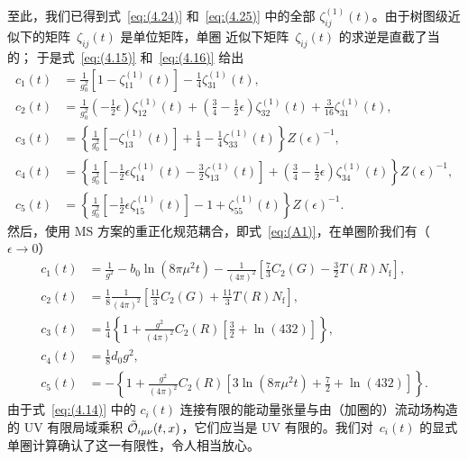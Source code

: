 至此，我们已得到式~\eqref{eq:(4.24)} 和~\eqref{eq:(4.25)}
中的全部 $\zeta_{ij}^{(1)}(t)$。由于树图级近似下的矩阵~$\zeta_{ij}(t)$ 是单位矩阵，单圈
近似下矩阵~$\zeta_{ij}(t)$ 的求逆是直截了当的；
于是式~\eqref{eq:(4.15)} 和~\eqref{eq:(4.16)} 给出
\begin{align}
   c_1(t)&=\frac{1}{g_0^2}
   \left[1-\zeta_{11}^{(1)}(t)\right]
   -\frac{1}{4}\zeta_{31}^{(1)}(t),
\label{eq:(4.55)}\\
   c_2(t)&=\frac{1}{g_0^2}
   \left(-\frac{1}{2}\epsilon\right)\zeta_{12}^{(1)}(t)
   +\left(\frac{3}{4}-\frac{1}{2}\epsilon\right)\zeta_{32}^{(1)}(t)
   +\frac{3}{16}\zeta_{31}^{(1)}(t),
\label{eq:(4.56)}\\
   c_3(t)&=\left\{\frac{1}{g_0^2}
   \left[-\zeta_{13}^{(1)}(t)\right]
   +\frac{1}{4}-\frac{1}{4}\zeta_{33}^{(1)}(t)\right\}Z(\epsilon)^{-1},
\label{eq:(4.57)}\\
   c_4(t)&=\left\{\frac{1}{g_0^2}
   \left[-\frac{1}{2}\epsilon\zeta_{14}^{(1)}(t)
   -\frac{3}{2}\zeta_{13}^{(1)}(t)\right]
   +\left(\frac{3}{4}-\frac{1}{2}\epsilon\right)\zeta_{34}^{(1)}(t)\right\}
   Z(\epsilon)^{-1},
\label{eq:(4.58)}\\
   c_5(t)&=\left\{\frac{1}{g_0^2}
   \left[-\frac{1}{2}\epsilon\zeta_{15}^{(1)}(t)\right]
   -1+\zeta_{55}^{(1)}(t)\right\}Z(\epsilon)^{-1}.
\label{eq:(4.59)}
\end{align}
然后，使用 $\text{MS}$ 方案的重正化规范耦合，即式~\eqref{eq:(A1)}，在单圈阶我们有（%
$\epsilon\to0$）
\begin{align}
   c_1(t)&
   =\frac{1}{g^2}-b_0\ln(8\pi\mu^2t)-\frac{1}{(4\pi)^2}
   \left[\frac{7}{3}C_2(G)
   -\frac{3}{2}T(R)N_{\mathrm{f}}\right],
\label{eq:(4.60)}\\
   c_2(t)&
   =\frac{1}{8}
   \frac{1}{(4\pi)^2}
   \left[\frac{11}{3}C_2(G)
   +\frac{11}{3}T(R)N_{\mathrm{f}}\right],
\label{eq:(4.61)}\\
   c_3(t)&
   =\frac{1}{4}\left\{1+\frac{g^2}{(4\pi)^2}C_2(R)
   \left[\frac{3}{2}+\ln(432)\right]\right\},
\label{eq:(4.62)}\\
   c_4(t)&=\frac{1}{8}d_0g^2,
\label{eq:(4.63)}\\
   c_5(t)&=-\left\{1+\frac{g^2}{(4\pi)^2}C_2(R)
   \left[3\ln(8\pi\mu^2t)+\frac{7}{2}+\ln(432)\right]\right\}.
\label{eq:(4.64)}
\end{align}
由于式~\eqref{eq:(4.14)} 中的 $c_i(t)$ 连接有限的能动量张量与由（加圈的）流动场构造的 UV
有限局域乘积 $\Tilde{\mathcal{O}}_{i\mu\nu}(t,x)$，它们应当是 UV 有限的。我们对~$c_i(t)$
的显式单圈计算确认了这一有限性，令人相当放心。

